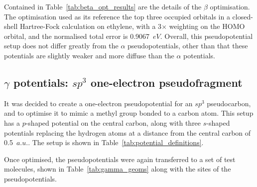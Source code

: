 \documentclass[aip,reprint,nofootinbib]{revtex4-1}
\begin{document}
Contained in Table~\ref{tab:beta_opt_results} are the details of the $\beta$ optimisation. The optimisation used as its reference the top three occupied orbitals in a closed-shell Hartree-Fock calculation on ethylene, with a 3$\times$ weighting on the HOMO orbital, and the normalised total error is 0.9067~$eV$. Overall, this pseudopotential setup does not differ greatly from the $\alpha$ pseudopotentials, other than that these potentials are slightly weaker and more diffuse than the $\alpha$ potentials. 

\subsection{$\gamma$ potentials: $sp^{3}$ one-electron pseudofragment}

It was decided to create a one-electron pseudopotential for an $sp^3$ pseudocarbon, and to  optimise it to mimic a methyl group bonded to a carbon atom. This setup has a $p$-shaped potential on the central carbon, along with three $s$-shaped potentials replacing the hydrogen atoms at a distance from the central carbon of 0.5~$a.u.$. The setup is shown in Table~\ref{tab:potential_definitions}.

Once optimised, the pseudopotentials were again transferred to a set of test molecules, shown in Table~\ref{tab:gamma_geoms} along with the sites of the pseudopotentials.
\end{document}
